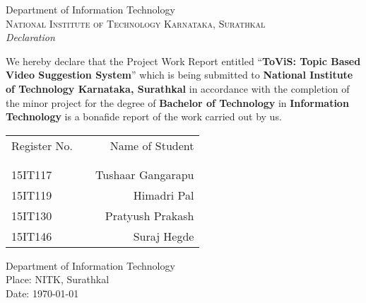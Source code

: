 \newpage
\thispagestyle{empty}

\begin{center}

\huge{Department of Information Technology}\\[0.5cm]
\normalsize
\textsc{National Institute of Technology Karnataka, Surathkal}\\[2.0cm]

\emph{\LARGE Declaration}\\[2cm]
\end{center}
\normalsize We hereby declare that the Project Work Report entitled ``\textbf{ToViS: Topic Based Video Suggestion System}'' which is being submitted to {\bf National Institute of Technology Karnataka, Surathkal} in accordance with the completion of the minor project for the degree of {\bf Bachelor of Technology} in {\bf Information Technology} is a bonafide report of the work carried out by us. \\[1.0cm]

\begin{table}[h]
\centering
\bgroup
\def\arraystretch{1.2}
\begin{tabular}{lcr}
Register No. & & Name of Student \\ \\ \hline
\\
15IT117 & & Tushaar Gangarapu \\ 
15IT119 & & Himadri Pal \\
15IT130 & & Pratyush Prakash \\
15IT146 & & Suraj Hegde \\
\end{tabular}
\egroup
\end{table}

\vfill


\begin{flushleft}
Department of Information Technology \\
Place: NITK, Surathkal \\
Date: \today
\end{flushleft}
